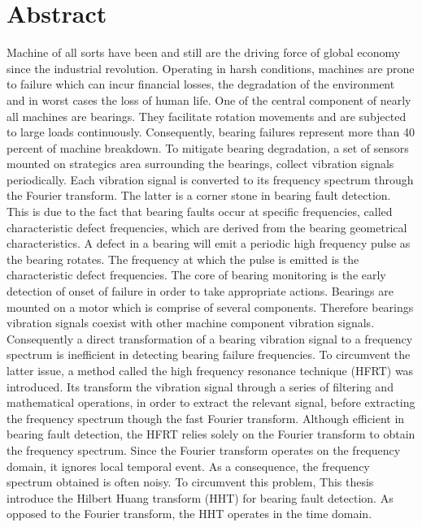 \documentclass[../Main/thesis.tex]{subfiles}
\begin{document}
\null\vfill
{}
\chapter*{Abstract}
Machine of all sorts have been and still are the driving force of global economy since the industrial revolution.
Operating in harsh conditions, machines are prone to failure which can incur financial losses, the degradation of the environment and in worst cases the loss of human life. 
\justify
 One of the central component of nearly all machines are bearings. They facilitate rotation movements and are subjected to large loads continuously. Consequently, bearing failures represent more than 40 percent of machine breakdown. To mitigate
 bearing degradation, a set of sensors mounted on strategics area surrounding the bearings, collect vibration signals periodically. Each vibration signal is converted to its frequency spectrum through the Fourier transform. The latter is a corner stone in bearing fault detection. This is due to the fact that bearing faults occur at specific frequencies, called characteristic defect frequencies, which are derived from the bearing geometrical characteristics. A defect in a bearing will emit a periodic high frequency pulse as the bearing rotates. The frequency at which the pulse is emitted is the characteristic defect frequencies.
 The core of bearing monitoring is the early detection of onset of failure in order to take appropriate actions.
 \justify
 Bearings are mounted on a motor which is comprise of several components. Therefore bearings vibration signals coexist with other machine component vibration signals. Consequently a direct transformation of a bearing vibration signal to a frequency spectrum is inefficient in detecting bearing failure frequencies. To circumvent the latter issue, a method called the high frequency resonance technique (HFRT) was introduced. Its transform the vibration signal through a series of filtering and mathematical operations, in order to extract the relevant signal, before extracting the frequency spectrum though the fast Fourier transform. 
 \justify
 Although efficient in bearing fault detection, the HFRT relies solely on the Fourier transform to obtain the frequency spectrum. Since the Fourier transform operates on the frequency domain, it ignores local temporal event. As a consequence, the frequency spectrum obtained is often noisy. To circumvent this problem, This thesis introduce the Hilbert Huang transform (HHT) for bearing fault detection. As opposed to the Fourier transform, the HHT operates in the time domain.
\end{document}
